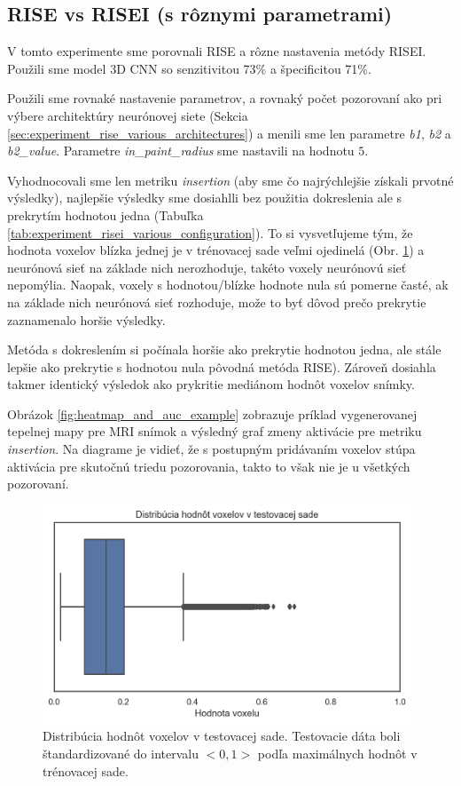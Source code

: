 \subsection{RISE vs RISEI (s rôznymi parametrami)}

V tomto experimente sme porovnali RISE a rôzne nastavenia metódy RISEI. Použili sme model 3D CNN so senzitivitou 73\% a špecificitou 71\%.

Použili sme rovnaké nastavenie parametrov, a rovnaký počet pozorovaní ako pri výbere architektúry neurónovej siete (Sekcia \ref{sec:experiment_rise_various_architectures}) a menili sme len parametre \textit{b1}, \textit{b2} a \textit{b2\_value}. Parametre \textit{in\_paint\_radius} sme nastavili na hodnotu $5$. 

Vyhodnocovali sme len metriku \textit{insertion} (aby sme čo najrýchlejšie získali prvotné výsledky), najlepšie výsledky sme dosiahlli bez použitia dokreslenia ale s prekrytím hodnotou jedna (Tabuľka \ref{tab:experiment_risei_various_configuration}). To si vysvetľujeme tým, že hodnota voxelov blízka jednej je v trénovacej sade veľmi ojedinelá (Obr. \ref{fig:test_dataset_voxel_distribution}) a neurónová sieť na základe nich nerozhoduje, takéto voxely neurónovú sieť nepomýlia. Naopak, voxely s hodnotou/blízke hodnote nula sú pomerne časté, ak na základe nich neurónová sieť rozhoduje, može to byť dôvod prečo prekrytie zaznamenalo horšie výsledky.

Metóda s dokreslením si počínala horšie ako prekrytie hodnotou jedna, ale stále lepšie ako prekrytie s hodnotou nula pôvodná metóda RISE). Zároveň dosiahla takmer identický výsledok ako prykritie mediánom hodnôt voxelov snímky.

Obrázok \ref{fig:heatmap_and_auc_example} zobrazuje príklad vygenerovanej tepelnej mapy pre MRI snímok a výsledný graf zmeny aktivácie pre metriku \textit{insertion}. Na diagrame je vidieť, že s postupným pridávaním voxelov stúpa aktivácia pre skutočnú triedu pozorovania, takto to však nie je u všetkých pozorovaní. 

\begin{figure}[h!]
    \centering
    \includegraphics[width=11cm]{assets/images/test_dataset_voxel_distribution.png}
    \caption{Distribúcia hodnôt voxelov v testovacej sade. Testovacie dáta boli štandardizované do intervalu $<0, 1>$ podľa maximálnych hodnôt v trénovacej sade.}
    \label{fig:test_dataset_voxel_distribution}
\end{figure}

